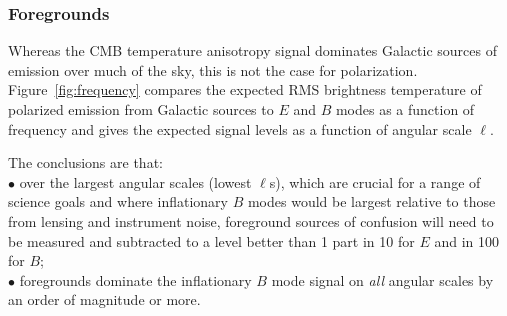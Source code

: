 \vspace{-0.18in}

\subsubsection{Foregrounds}
\label{sec:foregrounds}

\vspace{-0.05in}

Whereas the CMB temperature anisotropy signal dominates Galactic sources
of emission over much of the sky, this is not the case for polarization. 
Figure~\ref{fig:frequency} compares the expected RMS brightness temperature 
of polarized emission from Galactic sources to $E$ and $B$ modes
as a function of frequency and gives the expected signal levels as a function of angular scale $\ell$.  

\noindent The conclusions are that: \\
$\bullet$ \hspace{0.05in} over the largest angular scales (lowest $\ell$s), which are crucial for a range 
of science goals and where inflationary $B$ modes 
would be largest relative to those from lensing and instrument noise, foreground sources of confusion will need to be measured and subtracted to a level better than 1 part in 10 for $E$ and in 100 for $B$; \\
$\bullet$ \hspace{0.05in} foregrounds dominate the inflationary $B$ mode signal on {\it all} angular 
scales by an order of magnitude or more.


